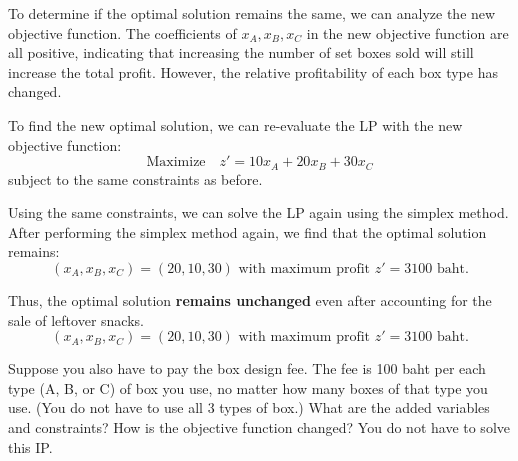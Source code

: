 \documentclass[a4paper, 10pt]{article}
\begin{document}
\begin{solution}
To determine if the optimal solution remains the same, we can analyze the new objective function.
The coefficients of \( x_A, x_B, x_C \) in the new objective function are all positive, indicating that increasing the number of set boxes sold will still increase the total profit.
However, the relative profitability of each box type has changed.

\vspace{2mm}

To find the new optimal solution, we can re-evaluate the LP with the new objective function:
\[ \text{Maximize} \quad z' = 10x_A + 20x_B + 30x_C \]
subject to the same constraints as before.

\vspace{2mm}

Using the same constraints, we can solve the LP again using the simplex method.
After performing the simplex method again, we find that the optimal solution remains:
\[ (x_A, x_B, x_C) = (20, 10, 30) \text{ with maximum profit } z' = 3100 \text{ baht}. \]

Thus, the optimal solution \textbf{remains unchanged} even after accounting for the sale of leftover snacks.
\[ \boxed{ (x_A, x_B, x_C) = (20, 10, 30) \text{ with maximum profit } z' = 3100 \text{ baht}. } \]
\end{solution}

\newpage

\begin{subproblems_alpha}[start=3]
    \item Suppose you also have to pay the box design fee.
    The fee is 100 baht per each type (A, B, or C) of box you use, no matter how many boxes of that type you use.
    (You do not have to use all 3 types of box.)
    What are the added variables and constraints?
    How is the objective function changed?
    You do not have to solve this IP.
\end{subproblems_alpha}
\end{document}

